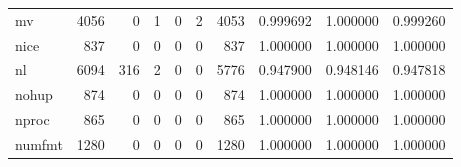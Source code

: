 \begin{tabular}{lrrrrrrrrr}
mv        &                                4056 &                                               0 &                                              1 &                                             0 &                                              2 &                                         4053 &                                           0.999692 &                               1.000000 &                             0.999260 \\
nice      &                                 837 &                                               0 &                                              0 &                                             0 &                                              0 &                                          837 &                                           1.000000 &                               1.000000 &                             1.000000 \\
nl        &                                6094 &                                             316 &                                              2 &                                             0 &                                              0 &                                         5776 &                                           0.947900 &                               0.948146 &                             0.947818 \\
nohup     &                                 874 &                                               0 &                                              0 &                                             0 &                                              0 &                                          874 &                                           1.000000 &                               1.000000 &                             1.000000 \\
nproc     &                                 865 &                                               0 &                                              0 &                                             0 &                                              0 &                                          865 &                                           1.000000 &                               1.000000 &                             1.000000 \\
numfmt    &                                1280 &                                               0 &                                              0 &                                             0 &                                              0 &                                         1280 &                                           1.000000 &                               1.000000 &                             1.000000 \\

\end{tabular}
